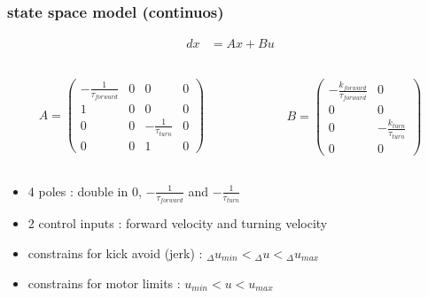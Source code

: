 \documentclass{beamer}
\begin{document}
\begin{frame}
\frametitle{\textbf { state space model (continuos)}}

  \begin{align*}
    dx &= Ax + Bu
  \end{align*}
  
  \begin{columns}

    \begin{column}{0.5\textwidth}

      \begin{align*}
        A =
        \begin{pmatrix}
          -\frac{1}{\tau_{forward}} & 0 & 0 & 0 \\
          1 & 0 & 0 & 0 \\
          0 & 0 & -\frac{1}{\tau_{turn}} & 0 \\
          0 & 0 & 1 & 0 
        \end{pmatrix}
      \end{align*}
    
    \end{column}


    \begin{column}{0.5\textwidth}

      \begin{align*}
        B =
        \begin{pmatrix}
          -\frac{k_{forward}}{\tau_{forward}} & 0 \\
          0 & 0 \\
          0 & -\frac{k_{turn}}{\tau_{turn}} \\
          0 & 0
        \end{pmatrix}
      \end{align*}

    \end{column}


  \end{columns}

  \begin{itemize}
    \item 4 poles : double in $0$, $-\frac{1}{\tau_{forward}}$ and $-\frac{1}{\tau_{turn}}$
    \item 2 control inputs : forward velocity and turning velocity
    \item constrains for kick avoid (jerk) : ${_\Delta}u_{min} < {_\Delta}u < {_\Delta}u_{max}$
    \item constrains for motor limits : $u_{min} < u < u_{max}$
  \end{itemize}

\end{frame}
\end{document}
